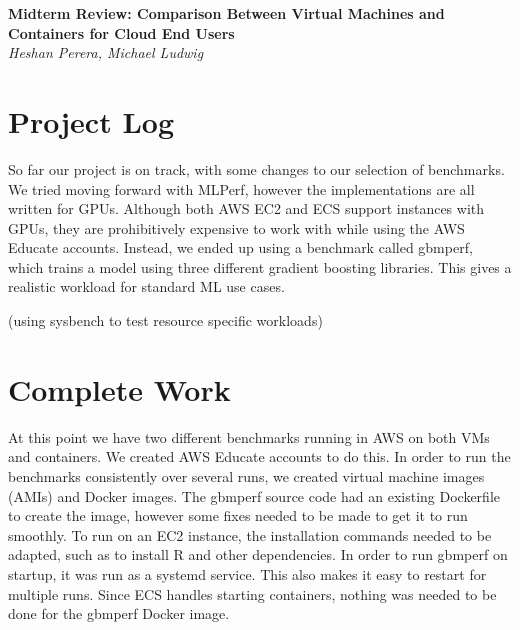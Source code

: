 \documentclass[11pt]{article}
\begin{document}
\renewcommand{\headrulewidth}{0pt} 
\renewcommand{\footrulewidth}{0pt} 
\pagestyle{fancy}
\cfoot{}
\lhead{}
\rhead{}
\lfoot{\itshape\textcolor{gray}{CS525T Cloud Computing Paper Review}}

\begin{center}
{\LARGE \bf Midterm Review: Comparison Between Virtual Machines and Containers for Cloud End Users} \\
{\normalsize \emph{Heshan Perera, Michael Ludwig}}\\

\end{center}

\section{Project Log}

So far our project is on track, with some changes to our selection of benchmarks. We tried moving forward with MLPerf, however the implementations are all written for GPUs. Although both AWS EC2 and ECS support instances with GPUs, they are prohibitively expensive to work with while using the AWS Educate accounts. Instead, we ended up using a benchmark called gbmperf, which trains a model using three different gradient boosting libraries. This gives a realistic workload for standard ML use cases.

(using sysbench to test resource specific workloads)

\section{Complete Work}

At this point we have two different benchmarks running in AWS on both VMs and containers. We created AWS Educate accounts to do this. In order to run the benchmarks consistently over several runs, we created virtual machine images (AMIs) and Docker images. The gbmperf source code had an existing Dockerfile to create the image, however some fixes needed to be made to get it to run smoothly. To run on an EC2 instance, the installation commands needed to be adapted, such as to install R and other dependencies. In order to run gbmperf on startup, it was run as a systemd service. This also makes it easy to restart for multiple runs. Since ECS handles starting containers, nothing was needed to be done for the gbmperf Docker image.
\end{document}
